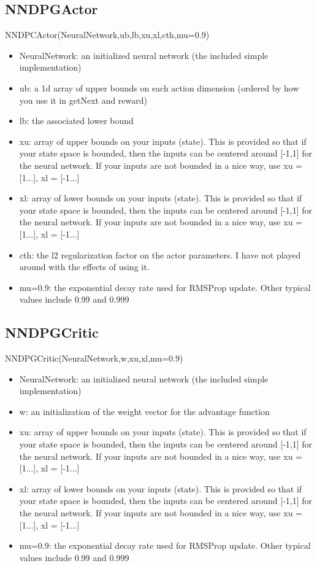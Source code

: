 \documentclass[a4paper]{article}
\begin{document}
\subsection{NNDPGActor}
NNDPCActor(NeuralNetwork,ub,lb,xu,xl,cth,mu=0.9)
\begin{itemize}
\item NeuralNetwork: an initialized neural network (the included simple implementation)
\item ub: a 1d array of upper bounds on each action dimension (ordered by how you use it in getNext and reward)
\item lb: the associated lower bound
\item xu: array of upper bounds on your inputs (state). This is provided so that if your state space is bounded, then the inputs can be centered around [-1,1] for the neural network. If your inputs are not bounded in a nice way, use xu = [1...], xl = [-1...]
\item xl: array of lower bounds on your inputs (state). This is provided so that if your state space is bounded, then the inputs can be centered around [-1,1] for the neural network. If your inputs are not bounded in a nice way, use xu = [1...], xl = [-1...]
\item cth: the l2 regularization factor on the actor parameters. I have not played around with the effects of using it.
\item mu=0.9: the exponential decay rate used for RMSProp update. Other typical values include 0.99 and 0.999
\end{itemize}

\subsection{NNDPGCritic}
NNDPGCritic(NeuralNetwork,w,xu,xl,mu=0.9)
\begin{itemize}
\item NeuralNetwork: an initialized neural network (the included simple implementation)
\item w: an initialization of the weight vector for the  advantage function
\item xu: array of upper bounds on your inputs (state). This is provided so that if your state space is bounded, then the inputs can be centered around [-1,1] for the neural network. If your inputs are not bounded in a nice way, use xu = [1...], xl = [-1...]
\item xl: array of lower bounds on your inputs (state). This is provided so that if your state space is bounded, then the inputs can be centered around [-1,1] for the neural network. If your inputs are not bounded in a nice way, use xu = [1...], xl = [-1...]
\item mu=0.9: the exponential decay rate used for RMSProp update. Other typical values include 0.99 and 0.999
\end{itemize}
\end{document}
